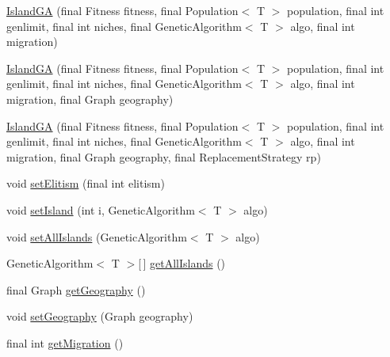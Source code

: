 \begin{DoxyCompactItemize}
\hyperlink{classjenes_1_1algorithms_1_1_island_g_a_3_01_t_01extends_01_chromosome_01_4_a8cf783104bfb991a4a0db319cf2403c4}{Island\-G\-A} (final Fitness fitness, final Population$<$ T $>$ population, final int genlimit, final int niches, final Genetic\-Algorithm$<$ T $>$ algo, final int migration)
\item 
\hyperlink{classjenes_1_1algorithms_1_1_island_g_a_3_01_t_01extends_01_chromosome_01_4_aaa6ac59257e351c4b2d50870ec48afee}{Island\-G\-A} (final Fitness fitness, final Population$<$ T $>$ population, final int genlimit, final int niches, final Genetic\-Algorithm$<$ T $>$ algo, final int migration, final Graph geography)
\item 
\hyperlink{classjenes_1_1algorithms_1_1_island_g_a_3_01_t_01extends_01_chromosome_01_4_a84cea4b1aab39f58e8c98f66592cdc17}{Island\-G\-A} (final Fitness fitness, final Population$<$ T $>$ population, final int genlimit, final int niches, final Genetic\-Algorithm$<$ T $>$ algo, final int migration, final Graph geography, final Replacement\-Strategy rp)
\item 
void \hyperlink{classjenes_1_1algorithms_1_1_island_g_a_3_01_t_01extends_01_chromosome_01_4_a8789904f010dfb4d86c236f16738f3cc}{set\-Elitism} (final int elitism)
\item 
void \hyperlink{classjenes_1_1algorithms_1_1_island_g_a_3_01_t_01extends_01_chromosome_01_4_aeb79089c053c729f16d8c1c5c1aa2601}{set\-Island} (int i, Genetic\-Algorithm$<$ T $>$ algo)
\item 
void \hyperlink{classjenes_1_1algorithms_1_1_island_g_a_3_01_t_01extends_01_chromosome_01_4_a46c43be9c86897a05eb25db32c0935c1}{set\-All\-Islands} (Genetic\-Algorithm$<$ T $>$ algo)
\item 
Genetic\-Algorithm$<$ T $>$\mbox{[}$\,$\mbox{]} \hyperlink{classjenes_1_1algorithms_1_1_island_g_a_3_01_t_01extends_01_chromosome_01_4_aadf9a8c907983a8ff03a6358b8270d82}{get\-All\-Islands} ()
\item 
final Graph \hyperlink{classjenes_1_1algorithms_1_1_island_g_a_3_01_t_01extends_01_chromosome_01_4_a36fb81c40aa049fc4af4c5a8ebdbc9e6}{get\-Geography} ()
\item 
void \hyperlink{classjenes_1_1algorithms_1_1_island_g_a_3_01_t_01extends_01_chromosome_01_4_ac40da22bb9de811c6a2712a67184dc06}{set\-Geography} (Graph geography)
\item 
final int \hyperlink{classjenes_1_1algorithms_1_1_island_g_a_3_01_t_01extends_01_chromosome_01_4_a74419cc71fe52538d241f7362b63709a}{get\-Migration} ()
\item 

\end{DoxyCompactItemize}

